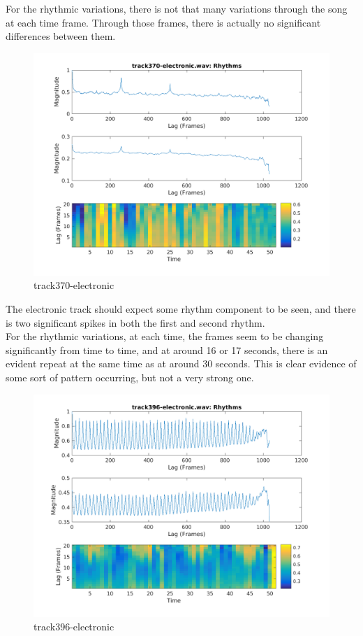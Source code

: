 \documentclass[11pt, a4paper]{article}
\begin{document}
For the rhythmic variations, there is not that many variations through the song at each time frame. Through those frames, there is actually no significant differences between them. 


\begin{figure}[H]
    \centering
    \includegraphics[width=.8\textwidth]{track370-electronic-Rhythm.png}
    \caption{track370-electronic}
\end{figure}

The electronic track should expect some rhythm component to be seen, and there is two significant spikes in both the first and second rhythm. \\

For the rhythmic variations, at each time, the frames seem to be changing significantly from time to time, and at around 16 or 17 seconds, there is an evident repeat at the same time as at around 30 seconds. This is clear evidence of some sort of pattern occurring, but not a very strong one. 


\begin{figure}[H]
    \centering
    \includegraphics[width=.8\textwidth]{track396-electronic-Rhythm.png}
    \caption{track396-electronic}
\end{figure}
\end{document}
